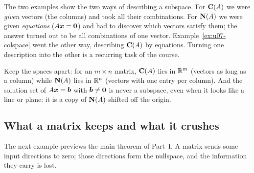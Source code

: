 The two examples show the two ways of describing a subspace. For $\mathbf{C}(A)$ we were
\emph{given} vectors (the columns) and took all their combinations. For $\mathbf{N}(A)$ we were given
\emph{equations} ($A\boldsymbol{x}=\boldsymbol{0}$) and had to discover which vectors satisfy them; the answer
turned out to be all combinations of one vector. Example~\ref{ex:u07-colspace} went the other
way, describing $\mathbf{C}(A)$ by equations. Turning one description into the other is a recurring
task of the course.

\begin{trap}
Keep the spaces apart: for an $m\times n$ matrix, $\mathbf{C}(A)$ lies in $\mathbb{R}^m$ (vectors as long as
a column) while $\mathbf{N}(A)$ lies in $\mathbb{R}^n$ (vectors with one entry per column). And the solution
set of $A\boldsymbol{x}=\boldsymbol{b}$ with $\boldsymbol{b}\neq\boldsymbol{0}$ is never a subspace, even when it looks like a
line or plane: it is a copy of $\mathbf{N}(A)$ shifted off the origin.
\end{trap}

\subsection{What a matrix keeps and what it crushes}

The next example previews the main theorem of Part~I. A matrix sends some input directions to
zero; those directions form the nullspace, and the information they carry is lost.


